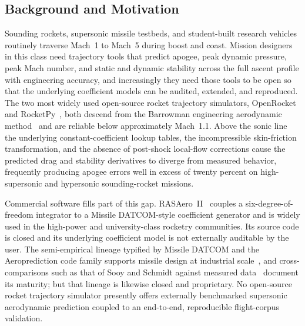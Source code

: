 
\subsection{Background and Motivation}

Sounding rockets, supersonic missile testbeds, and student-built research
vehicles routinely traverse Mach~1 to Mach~5 during boost and coast. Mission
designers in this class need trajectory tools that predict apogee, peak dynamic
pressure, peak Mach number, and static and dynamic stability across the full
ascent profile with engineering accuracy, and increasingly they need those
tools to be open so that the underlying coefficient models can be audited,
extended, and reproduced. The two most widely used open-source rocket
trajectory simulators, OpenRocket~\cite{niskanen2009} and
RocketPy~\cite{rocketpy2021}, both descend from the Barrowman engineering
aerodynamic method~\cite{barrowman1967} and are reliable below approximately
Mach~1.1. Above the sonic line the underlying constant-coefficient lookup
tables, the incompressible skin-friction transformation, and the absence of
post-shock local-flow corrections cause the predicted drag and stability
derivatives to diverge from measured behavior, frequently producing apogee
errors well in excess of twenty percent on high-supersonic and hypersonic
sounding-rocket missions.

Commercial software fills part of this gap. RASAero~II~\cite{rogers2015}
couples a six-degree-of-freedom integrator to a Missile DATCOM-style coefficient
generator and is widely used in the high-power and university-class rocketry
communities. Its source code is closed and its underlying coefficient model is
not externally auditable by the user. The semi-empirical lineage typified by
Missile DATCOM and the Aeroprediction code family supports missile design at
industrial scale~\cite{moore2001,mooremcinvillehymer2002}, and cross-comparisons
such as that of Sooy and Schmidt against measured data~\cite{sooy2005} document
its maturity; but that lineage is likewise closed and proprietary. No
open-source rocket trajectory simulator presently offers externally benchmarked
supersonic aerodynamic prediction coupled to an end-to-end, reproducible
flight-corpus validation.

